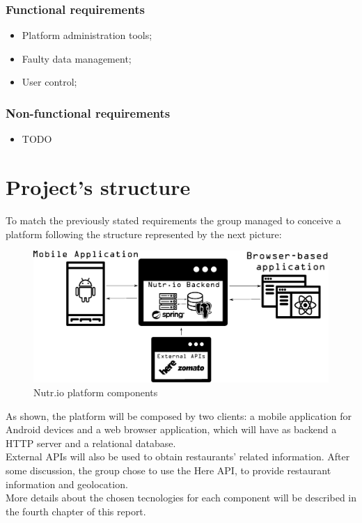 \subsubsection{Functional requirements}

\begin{itemize}
    \item Platform administration tools;
    \item Faulty data management;
    \item User control;
\end{itemize}

\subsubsection{Non-functional requirements}

\begin{itemize}
    \item TODO
\end{itemize}

\section{Project's structure}

To match the previously stated requirements the group managed to conceive a platform following the structure
represented by the next picture:\\

\begin{figure}[H]
    \begin{center}
        \includegraphics[scale=0.4]{_figures/Nutrio_components.eps}
        \caption{Nutr.io platform components}
    \end{center}
\end{figure}

As shown, the platform will be composed by two clients: a mobile application for Android devices and a web browser
application, which will have as backend a HTTP server and a relational database.\\

External APIs will also be used to obtain restaurants' related information. After some discussion, the group chose
to use the Here API, to provide restaurant information and geolocation.\\

More details about the chosen tecnologies for each component will be described in the fourth chapter of this report.\\